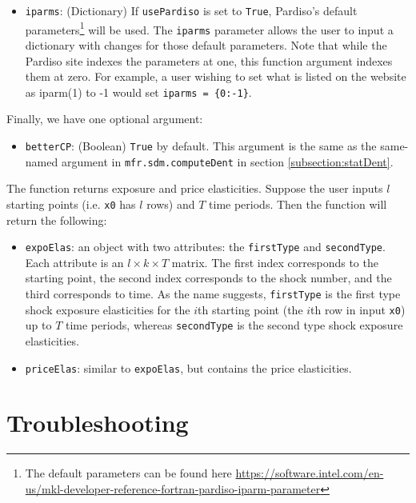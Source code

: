 \documentclass[12pt]{article}
\newcommand{\sdmProg}{mfr.sdm\xspace}
\begin{document}
\begin{itemize}
\item \texttt{iparms}: (Dictionary) If \texttt{usePardiso} is set to \texttt{True}, Pardiso's default parameters\footnote{The default parameters can be found here \href{https://software.intel.com/en-us/mkl-developer-reference-fortran-pardiso-iparm-parameter}{https://software.intel.com/en-us/mkl-developer-reference-fortran-pardiso-iparm-parameter}} will be used. The \texttt{iparms} parameter
allows the user to input a dictionary with changes for those default parameters.
Note that while the Pardiso site indexes the parameters at one, this function
argument indexes them at zero. For example, a user wishing to set what is listed
on the website as iparm(1) to -1 would set \texttt{iparms = \{0:-1\}}.

\end{itemize}

Finally, we have one optional argument:

\begin{itemize}
\item \texttt{betterCP}: (Boolean) \texttt{True} by default. This argument is the same as the same-named argument in  \texttt{\sdmProg.computeDent} in section \ref{subsection:statDent}.
\end{itemize}

The function returns exposure and price elasticities. Suppose the user inputs
$l$ starting points (i.e. \texttt{x0} has $l$ rows) and $T$ time periods. Then
the function will return the following:
\begin{itemize}
\item \texttt{expoElas}: an object with two attributes: the \texttt{firstType}
and \texttt{secondType}. Each attribute is an $l \times k \times T$ matrix. The
first index corresponds to the starting point, the second index corresponds to
the shock number, and the third corresponds to time. As the name suggests,
\texttt{firstType} is the first type shock exposure elasticities for the $i$th
starting point (the $i$th row in input \texttt{x0}) up to $T$ time periods,
whereas \texttt{secondType} is the second type shock exposure
elasticities.
\item \texttt{priceElas}: similar to \texttt{expoElas}, but contains the price
elasticities.
\end{itemize}

\newpage

\section{Troubleshooting}
\end{document}
